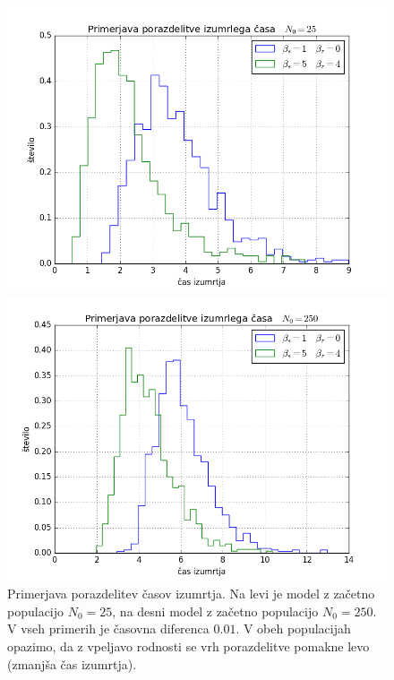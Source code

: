 \documentclass[slovene,11pt,a4paper]{article}
\numberwithin{equation}{section} %
\numberwithin{figure}{section} %
\numberwithin{table}{section} %
\begin{document}
\begin{figure}[h]
\centering
\begin{minipage}{0.5\textwidth}
\centering
\includegraphics[scale=0.45]{slike/porazdelitev_preprost_umrlirojstvocas_25.png}
\end{minipage}\hfill
\begin{minipage}{0.5\textwidth}
\centering
\includegraphics[scale=0.45]{slike/porazdelitev_preprost_umrlirojstvocas_250.png}
\end{minipage}
\caption{Primerjava porazdelitev časov izumrtja. Na levi je model z začetno populacijo $N_0=25$, na desni model z začetno populacijo $N_0=250$. V vseh primerih je časovna diferenca $0.01$. V obeh  populacijah opazimo, da z vpeljavo rodnosti se vrh porazdelitve pomakne levo (zmanjša čas izumrtja). }
\end{figure}
\end{document}
